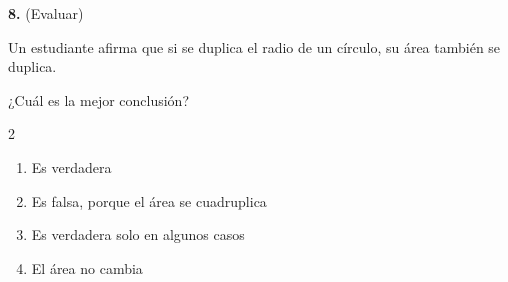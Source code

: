 \textbf{8.} (Evaluar)

Un estudiante afirma que si se duplica el radio de un círculo, su área también se duplica.

¿Cuál es la mejor conclusión?

\begin{multicols}{2}
\begin{enumerate}[label=\alph*), leftmargin=*]
\item Es verdadera
\item Es falsa, porque el área se cuadruplica
\item Es verdadera solo en algunos casos
\item El área no cambia
\end{enumerate}
\end{multicols}
